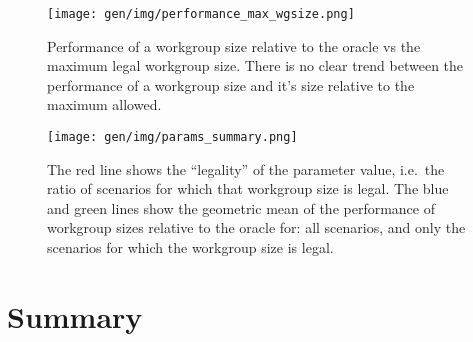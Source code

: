\begin{figure}
\centering
\texttt{[image: gen/img/performance\_max\_wgsize.png]}
\caption{%
  Performance of a workgroup size relative to the oracle vs the
  maximum legal workgroup size. There is no clear trend between the
  performance of a workgroup size and it's size relative to the
  maximum allowed.%
}
\end{figure}

\begin{figure}
\centering
\texttt{[image: gen/img/params\_summary.png]}
\caption{%
  The red line shows the ``legality'' of the parameter value, i.e.\
  the ratio of scenarios for which that workgroup size is legal.  The
  blue and green lines show the geometric mean of the performance of
  workgroup sizes relative to the oracle for: all scenarios, and only
  the scenarios for which the workgroup size is legal.%
}
\end{figure}



\section{Summary}
